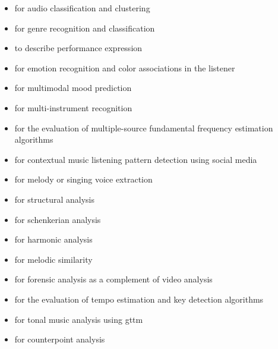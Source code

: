 \begin{itemize}


\item for audio classification and clustering \parencites{ilprints489}{DBLP:conf/ismir/HomburgMMMW05}{marcelo_queiroz_2018_1422585}
\item for genre recognition and classification \parencites{Tza02:Mus}{DBLP:conf/icmc/XuZY05}{DBLP:conf/ismir/SillaKK08}{icmc/bbp2372.2010.003}{DBLP:journals/corr/abs-1803-04652}{DBLP:journals/corr/WangH17a}{DBLP:journals/corr/MitraS14}{2010NJPh:12e3030C}{DBLP:journals/corr/abs-0812-4235}

\item to describe performance expression \parencites{DBLP:conf/ismir/HashidaMK08}{mitsuyo_hashida_2017_1401963}{mitsuyo_hashida_2018_1422503}
\item for emotion recognition and color associations in the listener \parencite{DBLP:conf/ismir/PesekGPSGSPM14}
\item for multimodal mood prediction \parencites{DBLP:journals/corr/abs-1809-07276}{xiao_hu_2014_850795}{humberto_corona_2015_851021}


\item for multi-instrument recognition \parencite{DBLP:conf/ismir/HumphreyDM18}
\item for the evaluation of multiple-source fundamental frequency estimation algorithms \parencite{DBLP:conf/ismir/YehBR07}
\item for contextual music listening pattern detection using social media \parencite{DBLP:conf/ismir/HaugerSKT13}
\item for melody \parencites{ioannis_karydis_2007_849469}{DBLP:conf/ismir/BittnerSTMCB14} or singing voice \parencite{DBLP:journals/corr/abs-1711-00048} extraction


\item for structural analysis \parencite{DBLP:conf/ismir/SmithBFRD11}
\item for schenkerian analysis \parencite{DBLP:conf/ismir/Kirlin14}
\item for harmonic analysis \parencite{DBLP:conf/ismir/DevaneyACN15}
\item for melodic similarity \parencite{goffredo_haus_2005_849297}
\item for forensic analysis as a complement of video analysis \parencite{serizel:hal-01393959}
\item for the evaluation of tempo estimation and key detection algorithms \parencite{DBLP:conf/ismir/KneesFHVBHG15}
\item for tonal music analysis using \gls{gttm} \parencite{DBLP:conf/ismir/HamanakaHT14}
\item for counterpoint analysis \parencite{DBLP:conf/ismir/AntilaC14}



\end{itemize}

